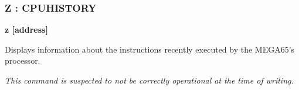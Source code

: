 \subsubsection{Z : CPUHISTORY}
\begin{description}[leftmargin=2cm,style=nextline]
\item [Format:] {\bf z [address]}
\item [Usage:] Displays information about the instructions recently executed by
  the MEGA65's processor.

\item [Remarks:] {\em This command is suspected to not be correctly operational at
  the time of writing.}

\end{description}




